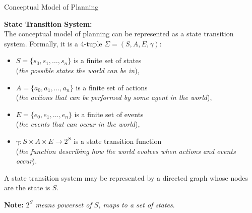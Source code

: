 \documentclass[9pt]{beamer}
\begin{document}
\begin{frame}{Conceptual Model of Planning}
\begin{small}

\textbf{State Transition System:}\\
The conceptual model of planning can be represented as a state transition system. Formally, it is a 4-tuple $\Sigma=(S,A,E,\gamma)$:

\begin{itemize}
\item $S=\{s_0, s_1, \dots, s_n\}$ is a finite set of states\\(\textit{the possible states the world can be in}),
\item $A= \{a_0, a_1, \dots, a_n\}$ is a finite set of actions\\(\textit{the actions that can be performed by some agent in the world}),
\item $E=\{e_0, e_1, \dots, e_n\}$ is a finite set of events\\(\textit{the events that can occur in the world}),
\item $\gamma: S \times A \times E \rightarrow 2^S$ is a state transition function\\(\textit{the function describing how the world evolves when actions and events occur}).
\end{itemize}

A state transition system may be represented by a directed graph whose nodes are the state is $S$.

\textbf{Note:} \emph{$2^S$ means powerset of $S$, maps to a set of states}.

\end{small}
\end{frame}
\end{document}
